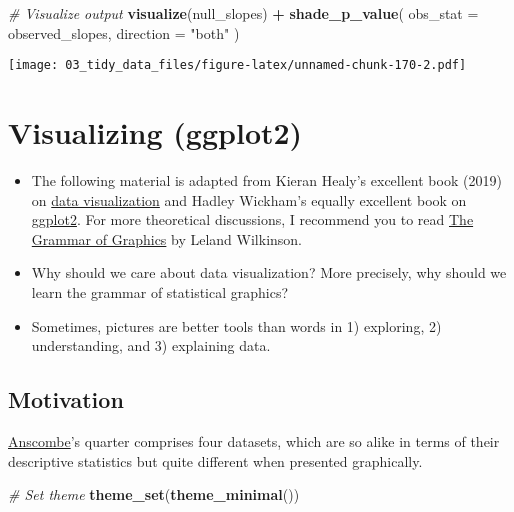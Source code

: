 \documentclass[
]{book}
\newenvironment{Shaded}{\begin{snugshade}}{\end{snugshade}}
\newcommand{\CommentTok}[1]{\textcolor[rgb]{0.56,0.35,0.01}{\textit{#1}}}
\newcommand{\DataTypeTok}[1]{\textcolor[rgb]{0.13,0.29,0.53}{#1}}
\newcommand{\KeywordTok}[1]{\textcolor[rgb]{0.13,0.29,0.53}{\textbf{#1}}}
\newcommand{\NormalTok}[1]{#1}
\newcommand{\OperatorTok}[1]{\textcolor[rgb]{0.81,0.36,0.00}{\textbf{#1}}}
\newcommand{\StringTok}[1]{\textcolor[rgb]{0.31,0.60,0.02}{#1}}
\begin{document}
\begin{Shaded}
\begin{Highlighting}[]
\CommentTok{\# Visualize output}
\KeywordTok{visualize}\NormalTok{(null\_slopes) }\OperatorTok{+}
\StringTok{  }\KeywordTok{shade\_p\_value}\NormalTok{(}
    \DataTypeTok{obs\_stat =}\NormalTok{ observed\_slopes,}
    \DataTypeTok{direction =} \StringTok{"both"}
\NormalTok{  )}
\end{Highlighting}
\end{Shaded}

\texttt{[image: 03\_tidy\_data\_files/figure-latex/unnamed-chunk-170-2.pdf]}

\hypertarget{visualizing-ggplot2}{%
\section{Visualizing (ggplot2)}\label{visualizing-ggplot2}}

\begin{itemize}
\item
  The following material is adapted from Kieran Healy's excellent book (2019) on \href{https://socviz.co/}{data visualization} and Hadley Wickham's equally excellent book on \href{https://ggplot2-book.org/}{ggplot2}. For more theoretical discussions, I recommend you to read \href{https://link.springer.com/book/10.1007\%2F0-387-28695-0}{The Grammar of Graphics} by Leland Wilkinson.
\item
  Why should we care about data visualization? More precisely, why should we learn the grammar of statistical graphics?
\item
  Sometimes, pictures are better tools than words in 1) exploring, 2) understanding, and 3) explaining data.
\end{itemize}

\hypertarget{motivation-2}{%
\subsection{Motivation}\label{motivation-2}}

\href{https://en.wikipedia.org/wiki/Frank_Anscombe}{Anscombe}'s quarter comprises four datasets, which are so alike in terms of their descriptive statistics but quite different when presented graphically.

\begin{Shaded}
\begin{Highlighting}[]
\CommentTok{\# Set theme}
\KeywordTok{theme\_set}\NormalTok{(}\KeywordTok{theme\_minimal}\NormalTok{())}
\end{Highlighting}
\end{Shaded}
\end{document}
